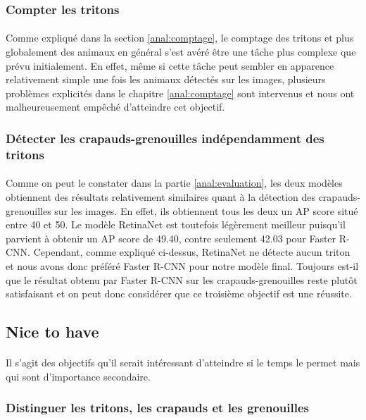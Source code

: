 \subsubsection{Compter les tritons}\label{anal:tritons}
\paragraph{} Comme expliqué dans la section \ref{anal:comptage}, le comptage des tritons et plus globalement des animaux en général s'est avéré être une tâche plus complexe que prévu initialement. En effet, même si cette tâche peut sembler en apparence relativement simple une fois les animaux détectés sur les images, plusieurs problèmes explicités dans le chapitre \ref{anal:comptage} sont intervenus et nous ont malheureusement empêché d'atteindre cet objectif.

\subsubsection{Détecter les crapauds-grenouilles indépendamment des tritons}
\paragraph{} Comme on peut le constater dans la partie \ref{anal:evaluation}, les deux modèles obtiennent des résultats relativement similaires quant à la détection des crapauds-grenouilles sur les images. En effet, ils obtiennent tous les deux un AP score situé entre 40 et 50. Le modèle RetinaNet est toutefois légèrement meilleur puisqu'il parvient à obtenir un AP score de 49.40, contre seulement 42.03 pour Faster R-CNN. Cependant, comme expliqué ci-dessus, RetinaNet ne détecte aucun triton et nous avons donc préféré Faster R-CNN pour notre modèle final. Toujours est-il que le résultat obtenu par Faster R-CNN sur les crapauds-grenouilles reste plutôt satisfaisant et on peut donc considérer que ce troisième objectif est une réussite.

\subsection{Nice to have}
\paragraph{} Il s'agit des objectifs qu'il serait intéressant d'atteindre si le temps le permet mais qui sont d'importance secondaire.

\subsubsection{Distinguer les tritons, les crapauds et les grenouilles}
